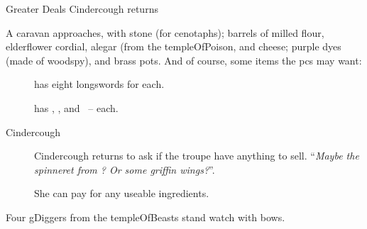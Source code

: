 \documentclass[10pt,twoside]{book}
\begin{document}
{Greater Deals}%
{Cindercough returns}%


A caravan approaches, with stone (for cenotaphs); barrels of milled flour, elderflower cordial, alegar (from the \gls{templeOfPoison}, and cheese; purple dyes (made of \gls{woodspy}), and brass pots.
And of course, some items the \glspl{pc} may want:

\begin{description}
  \item[\composeHumanName]
  has eight longswords for  each.
  \item[\composeHumanName]
  has \rations, \rations, and \rations\ --  each.
  \item[Cindercough]
  Cindercough returns to ask if the troupe have anything to sell.
  ``\textit{Maybe the spinneret from ?  Or some \gls{griffin} wings?}''.

  She can pay  for any useable \glspl{ingredient}.
\end{description}

Four \glspl{gDigger} from the \gls{templeOfBeasts} stand watch with \glspl{bow}.
\end{document}
